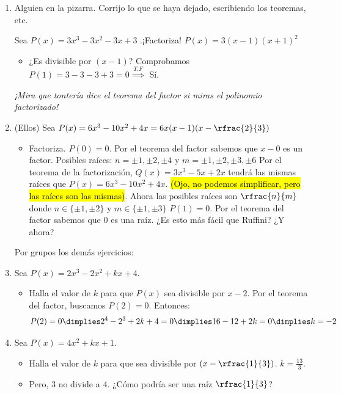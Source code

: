 \begin{enumerate}
\item Alguien en la pizarra. Corrijo lo que se haya dejado, escribiendo los teoremas, etc.

Sea $P(x) = 3x^3-3x^2-3x+3$ .¡Factoriza! $P(x) = 3(x-1)(x+1)^2$

\begin{itemize}
	\item ¿Es divisible por $(x-1)$? Comprobamos $P(1) = 3-3-3+3 = 0 \overset{T.F}{\implies}$ Sí.
\end{itemize}

\textit{¡Mira que tontería dice el teorema del factor si miras el polinomio factorizado!}

\item (Ellos) Sea $P(x) = 6x^3-10x^2+4x = 6x(x-1)(x-\rfrac{2}{3})$ 
\begin{itemize}
	\item Factoriza.
	\subitem $P(0) = 0$. Por el teorema del factor sabemos que $x-0$ es un factor.
	\subitem Posibles raíces: $n=\pm1,\pm2,\pm4$ y $m=\pm1,\pm2,\pm3,\pm6$	
	\subitem Por el teorema de la factorización, $Q(x) = 3x^3-5x+2x$ tendrá las mismas raíces que $P(x) = 6x^3-10x^2+4x$. \hl{(Ojo, no podemos simplificar, pero las raíces son las mismas)}. Ahora las posibles raíces son $\rfrac{n}{m}$ donde $n\in\{\pm1,\pm2\}$ y $m\in\{\pm1,\pm3\}$
	\subitem $P(1) = 0$. Por el teorema del factor sabemos que $0$ es una raíz. ¿Es esto más fácil que Ruffini? ¿Y ahora?
\end{itemize}

Por grupos los demás ejercicios:
\item Sea $P(x) = 2x^3-2x^2+kx+4$.
\begin{itemize}
	\item Halla el valor de $k$ para que $P(x)$ sea divisible por $x-2$.
	\subitem Por el teorema del factor, buscamos $P(2) = 0$. Entonces:
	\[
		P(2) = 0 \dimplies 2^4-2^3+2k+4 = 0 \dimplies 16-12+2k = 0 \dimplies k = -2
	\]
\end{itemize}




\item Sea $P(x) = 4x^2+kx+1$.
\begin{itemize}
	\item Halla el valor de $k$ para que sea divisible por $\left(x-\rfrac{1}{3}\right)$. $k=\frac{13}{3}$.
	\item Pero, $3$ no divide a $4$. ¿Cómo podría ser una raíz $\rfrac{1}{3}$?
\end{itemize}



\end{enumerate}

